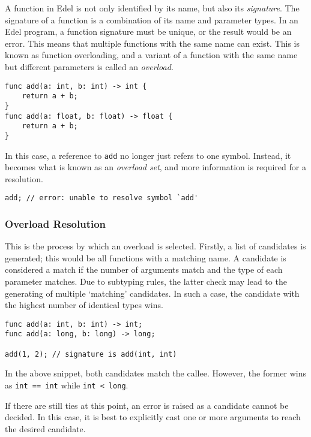 \documentclass{article}
\begin{document}
    A function in Edel is not only identified by its name, but also its \textit{signature}.
    The signature of a function is a combination of its name and parameter types.
    In an Edel program, a function signature must be unique, or the result would be an error.
    This means that multiple functions with the same name can exist.
    This is known as function overloading, and a variant of a function with the same name but different parameters is called an \textit{overload}.

    \begin{lstlisting}[language=CustomLang]
func add(a: int, b: int) -> int {
    return a + b;
}
func add(a: float, b: float) -> float {
    return a + b;
}
    \end{lstlisting}

    In this case, a reference to \texttt{add} no longer just refers to one symbol.
    Instead, it becomes what is known as an \textit{overload set}, and more information is required for a resolution.

    \begin{lstlisting}[language=CustomLang]
add; // error: unable to resolve symbol `add'
    \end{lstlisting}

    \subsubsection{Overload Resolution}

    This is the process by which an overload is selected.
    Firstly, a list of candidates is generated; this would be all functions with a matching name.
    A candidate is considered a match if the number of arguments match and the type of each parameter matches.
    Due to subtyping rules, the latter check may lead to the generating of multiple `matching' candidates.
    In such a case, the candidate with the highest number of identical types wins.

    \begin{lstlisting}[language=CustomLang]
func add(a: int, b: int) -> int;
func add(a: long, b: long) -> long;

add(1, 2); // signature is add(int, int)
    \end{lstlisting}

    In the above snippet, both candidates match the callee.
    However, the former wins as \texttt{int == int} while \texttt{int < long}.

    If there are still ties at this point, an error is raised as a candidate cannot be decided.
    In this case, it is best to explicitly cast one or more arguments to reach the desired candidate.
\end{document}
